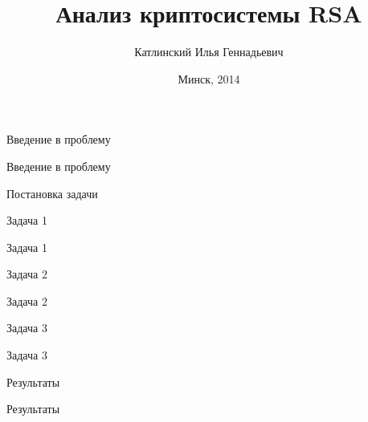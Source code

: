 \documentclass[10pt,pdf,hyperref={unicode}]{beamer}
\begin{document}
\title{Анализ криптосистемы RSA}

\author{Катлинский Илья Геннадьевич}
\date{Минск, 2014}

\frame{\titlepage} 

\begin{frame}{Введение в проблему}
	\begin{center}
		Введение в проблему 
	\end{center}
\end{frame}

\begin{frame}{Постановка задачи}
	\pause

		\begin{block}{1}
			
		\end{block}

	\pause

		\begin{block}{2}
		
		\end{block}

	\pause

		\begin{block}{3}
		
		\end{block}
\end{frame}

\begin{frame}{Задача 1}
	\begin{center}
		Задача 1 
	\end{center}
\end{frame}

\begin{frame}{Задача 2}
	\begin{center}
		Задача 2 
	\end{center}
\end{frame}

\begin{frame}{Задача 3}
	\begin{center}
		Задача 3 
	\end{center}
\end{frame}

\begin{frame}{Результаты}
	\begin{center}
		Результаты
	\end{center}
\end{frame}
\end{document}
